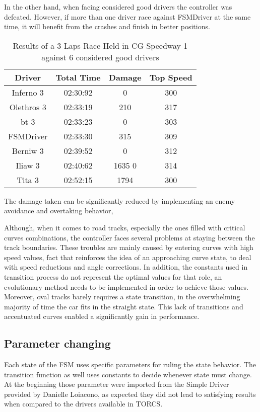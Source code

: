In the other hand, when facing considered good drivers the controller was defeated. However, if more than one driver race against FSMDriver at the same time, it will benefit from the crashes and finish in better positions.

\begin{table}[h]
\renewcommand{\arraystretch}{1.3}
\caption{Results of a 3 Laps Race Held in CG Speedway 1 against 6 considered good drivers}
\label{table_4}
\centering
\begin{tabular}{c||c||c||c}
\hline  \bfseries Driver & \bfseries Total Time & \bfseries  Damage & \bfseries Top Speed \\ 
\hline Inferno 3 & 02:30:92 & 0 & 300 \\ 
\hline Olethros 3 & 02:33:19 & 210 & 317 \\  
\hline bt 3 & 02:33:23 & 0 & 303 \\  
\hline FSMDriver & 02:33:30 & 315 & 309 \\  
\hline Berniw 3 & 02:39:52 & 0 & 312 \\
\hline Iliaw 3 & 02:40:62 & 1635 0 & 314 \\
\hline Tita 3 & 02:52:15 & 1794 & 300 \\
\hline 
\end{tabular}
\end{table} 


The damage taken can be significantly reduced by implementing an enemy avoidance and overtaking behavior,

Although, when it comes to road tracks, especially the ones filled with critical curves combinations, the controller faces several problems at staying between the track boundaries. These troubles are mainly caused by entering curves with high speed values, fact that reinforces the idea of an approaching curve state, to deal with speed reductions and angle corrections. In addition, the constants used in transition process do not represent the optimal values for that role, an evolutionary method needs to be implemented in order to achieve those values. Moreover, oval tracks barely requires a state transition, in the overwhelming majority of time the car fits in the straight state. This lack of transitions and accentuated curves enabled
a significantly gain in performance.

\subsection{Parameter changing}
Each state of the FSM uses specific parameters for ruling the state behavior. The transition function as well uses constants to decide whenever state must change. At the beginning those parameter were imported from the Simple Driver provided by Danielle Loiacono, as expected they did not lead to satisfying results when compared to the drivers available in TORCS.


